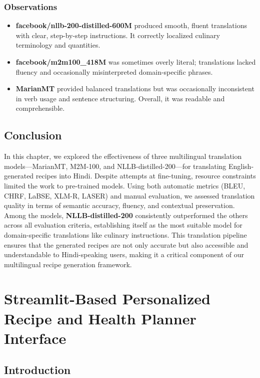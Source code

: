 \documentclass[letterpaper,11pt]{report}
\begin{document}
\subsection*{Observations}
\begin{itemize}
    \item \textbf{facebook/nllb-200-distilled-600M} produced smooth, fluent translations with clear, step-by-step instructions. It correctly localized culinary terminology and quantities.
    \item \textbf{facebook/m2m100\_418M} was sometimes overly literal; translations lacked fluency and occasionally misinterpreted domain-specific phrases.
    \item \textbf{MarianMT} provided balanced translations but was occasionally inconsistent in verb usage and sentence structuring. Overall, it was readable and comprehensible.
\end{itemize}


\section{Conclusion}
In this chapter, we explored the effectiveness of three multilingual translation models—MarianMT, M2M-100, and NLLB-distilled-200—for translating English-generated recipes into Hindi. Despite attempts at fine-tuning, resource constraints limited the work to pre-trained models. Using both automatic metrics (BLEU, CHRF, LaBSE, XLM-R, LASER) and manual evaluation, we assessed translation quality in terms of semantic accuracy, fluency, and contextual preservation. Among the models, \textbf{NLLB-distilled-200} consistently outperformed the others across all evaluation criteria, establishing itself as the most suitable model for domain-specific translations like culinary instructions. This translation pipeline ensures that the generated recipes are not only accurate but also accessible and understandable to Hindi-speaking users, making it a critical component of our multilingual recipe generation framework.

\chapter{Streamlit-Based Personalized Recipe and Health Planner Interface}

\section{Introduction}
\end{document}
